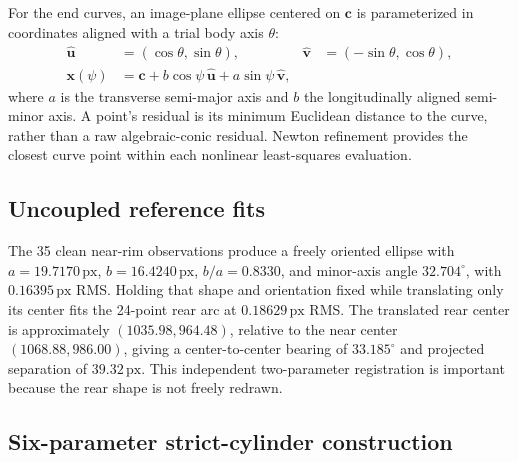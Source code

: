 \documentclass[11pt,letterpaper]{article}
\newcommand{\px}{\,\mathrm{px}}
\newcommand{\mat}[1]{\mathbf{#1}}
\begin{document}
For the end curves, an image-plane ellipse centered on \(\mat c\) is parameterized in coordinates aligned with a trial body axis \(\theta\):
\begin{align}
 \hat{\mat u}&=(\cos\theta,\sin\theta), &
 \hat{\mat v}&=(-\sin\theta,\cos\theta),\\
 \mat x(\psi)&=\mat c+b\cos\psi\,\hat{\mat u}
 +a\sin\psi\,\hat{\mat v},
 \label{eq:ellipse}
\end{align}
where \(a\) is the transverse semi-major axis and \(b\) the longitudinally aligned semi-minor axis. A point's residual is its minimum Euclidean distance to the curve, rather than a raw algebraic-conic residual. Newton refinement provides the closest curve point within each nonlinear least-squares evaluation.

\subsection{Uncoupled reference fits}

The 35 clean near-rim observations produce a freely oriented ellipse with \(a=19.7170\px\), \(b=16.4240\px\), \(b/a=0.8330\), and minor-axis angle \(32.704^\circ\), with \(0.16395\px\) RMS. Holding that shape and orientation fixed while translating only its center fits the 24-point rear arc at \(0.18629\px\) RMS. The translated rear center is approximately \((1035.98,964.48)\), relative to the near center \((1068.88,986.00)\), giving a center-to-center bearing of \(33.185^\circ\) and projected separation of \(39.32\px\). This independent two-parameter registration is important because the rear shape is not freely redrawn.

\subsection{Six-parameter strict-cylinder construction}
\label{sec:strict}
\end{document}
